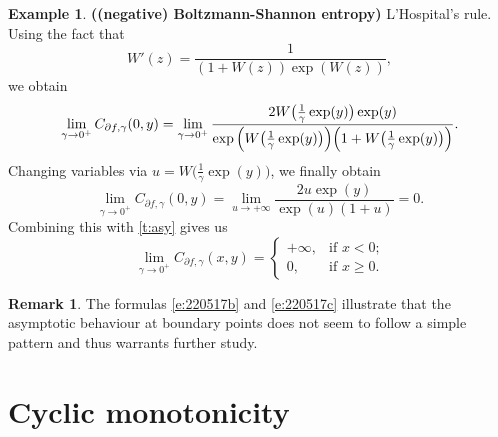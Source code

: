 \documentclass[12pt]{article}
\theoremstyle{definition}
\newtheorem{example}[theorem]{Example}
\newtheorem{remark}[theorem]{Remark}
\DeclarePairedDelimiter{\parens}{\lparen}{\rparen}
\begin{document}
{\begin{example} {\bf ((negative) Boltzmann-Shannon entropy)}
L'Hospital's rule. Using the fact that 
\begin{equation}
W'(z) = \frac{1}{(1 + W(z)) \exp(W(z))},
\end{equation}
we obtain
 \begin{equation}
 \lim_{\gamma\to 0^+} C_{\partial f,\gamma}(0,y)
 = 
 \lim_{\gamma\to 0^+}\frac{2 W\big(\frac{1}{\gamma}\exp( y)\big)\exp( y)}{\exp\Big(W\big(\frac{1}{\gamma}\exp( y)\big)\Big) \parens*{1+W\big(\frac{1}{\gamma}\exp( y)\big)}}.
\end{equation}
Changing variables via
$u=W\big(\frac{1}{\gamma}\exp( y)\big)$,
we finally obtain 
\begin{equation}
\label{e:220517c}
 \lim_{\gamma\to 0^+} C_{\partial f,\gamma}(0,y)
 = 
\lim_{u\to+\infty}\frac{2u\exp(y)}{\exp(u)(1+u)}=0.
\end{equation}
Combining this with \cref{t:asy} gives us
\begin{equation}
\lim_{\gamma\to 0^+} C_{\partial f,\gamma}(x,y) = 
\begin{cases}
+\infty, &\text{if $x<0$;}\\
0, &\text{if $x\geq 0$}.
\end{cases}
\end{equation}
\end{example}

\begin{remark}
The formulas \cref{e:220517b} and \cref{e:220517c} illustrate
that the asymptotic behaviour at boundary points does not seem
to follow a simple pattern and thus warrants further study.
\end{remark}



\section{Cyclic monotonicity}

\label{sec:ncyc}


}
\end{document}
